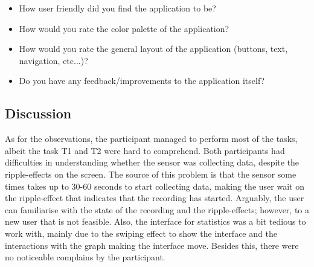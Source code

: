\begin{itemize}
    \item How user friendly did you find the application to be? 
    \item How would you rate the color palette of the application? 
    \item How would you rate the general layout of the application (buttons, text, navigation, etc...)?
    \item Do you have any feedback/improvements to the application itself?
\end{itemize}

\subsection{Discussion}

As for the observations, the participant managed to perform most of the tasks, albeit the task T1 and T2 were hard to comprehend. Both participants had difficulties in understanding whether the sensor was collecting data, despite the ripple-effects on the screen. The source of this problem is that the sensor some times takes up to 30-60 seconds to start collecting data, making the user wait on the ripple-effect that indicates that the recording has started. Arguably, the user can familiarise with the state of the recording and the ripple-effects; however, to a new user that is not feasible. Also, the interface for statistics was a bit tedious to work with, mainly due to the swiping effect to show the interface and the interactions with the graph making the interface move. Besides this, there were no noticeable complains by the participant. 

